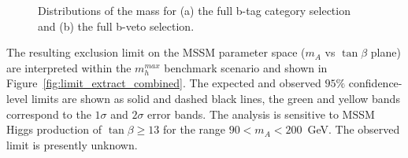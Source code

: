 \begin{figure}[tp]
     \begin{center}

    \end{center}
    \caption{Distributions of the \mmc mass for (a) the full b-tag category selection and (b) the full b-veto selection.}
   \label{fig:mmc_categories}
\end{figure}


The resulting exclusion limit on the MSSM parameter space ($m_A$ vs $\tan\beta$ plane) are interpreted 
within the $m_{h}^{max}$ benchmark scenario \cite{MSSMmhmax} and  shown in 
%
Figure~\ref{fig:limit_extract_combined}. %
%
The expected and observed $95\%$ confidence-level limits are shown as solid and dashed black lines, the green 
and yellow bands correspond to the $1\sigma$ and $2\sigma$ error bands. 
The analysis is sensitive to MSSM Higgs production of $\tan\beta \geq 13$ for the range $90<m_A<200$~GeV.
The observed limit is presently unknown. %


